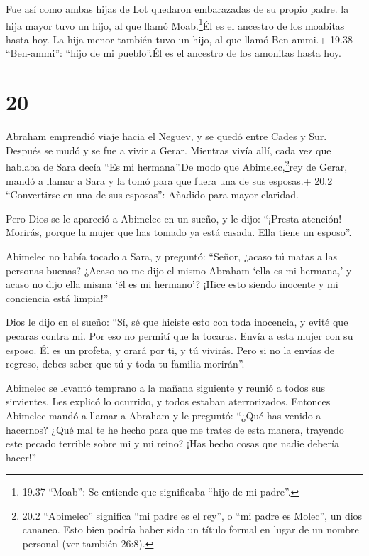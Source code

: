 Fue así como ambas hijas de Lot quedaron embarazadas de su
propio padre.  la hija mayor tuvo un hijo, al que llamó
Moab.\footnote{19.37 ``Moab'': Se entiende que significaba ``hijo de mi
  padre''.}Él es el ancestro de los moabitas hasta hoy.  La
hija menor también tuvo un hijo, al que llamó Ben-ammi.+ 19.38
``Ben-ammi'': ``hijo de mi pueblo''.Él es el ancestro de los amonitas
hasta hoy.

\hypertarget{section-19}{%
\section{20}\label{section-19}}

 Abraham emprendió viaje hacia el Neguev, y se quedó entre
Cades y Sur. Después se mudó y se fue a vivir a Gerar. 
Mientras vivía allí, cada vez que hablaba de Sara decía ``Es mi
hermana''.De modo que Abimelec,\footnote{20.2 ``Abimelec'' significa
  ``mi padre es el rey'', o ``mi padre es Molec'', un dios cananeo. Esto
  bien podría haber sido un título formal en lugar de un nombre personal
  (ver también 26:8).}rey de Gerar, mandó a llamar a Sara y la tomó para
que fuera una de sus esposas.+ 20.2 ``Convertirse en una de sus
esposas'': Añadido para mayor claridad.

 Pero Dios se le apareció a Abimelec en un sueño, y le dijo:
``¡Presta atención! Morirás, porque la mujer que has tomado ya está
casada. Ella tiene un esposo''.

 Abimelec no había tocado a Sara, y preguntó: ``Señor,
¿acaso tú matas a las personas buenas?  ¿Acaso no me dijo el
mismo Abraham `ella es mi hermana,' y acaso no dijo ella misma `él es mi
hermano'? ¡Hice esto siendo inocente y mi conciencia está limpia!''

 Dios le dijo en el sueño: ``Sí, sé que hiciste esto con
toda inocencia, y evité que pecaras contra mi. Por eso no permití que la
tocaras.  Envía a esta mujer con su esposo. Él es un
profeta, y orará por ti, y tú vivirás. Pero si no la envías de regreso,
debes saber que tú y toda tu familia morirán''.

 Abimelec se levantó temprano a la mañana siguiente y reunió
a todos sus sirvientes. Les explicó lo ocurrido, y todos estaban
aterrorizados.  Entonces Abimelec mandó a llamar a Abraham y
le preguntó: ``¿Qué has venido a hacernos? ¿Qué mal te he hecho para que
me trates de esta manera, trayendo este pecado terrible sobre mi y mi
reino? ¡Has hecho cosas que nadie debería hacer!''

